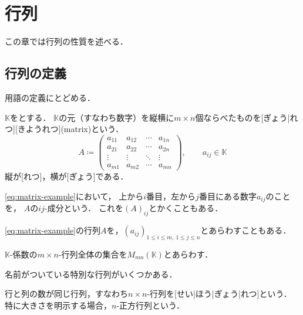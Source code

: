 \documentclass[../sotsu.tex]{subfiles}
\begin{document}
\section{行列}
\label{sec:matrix}

この章では行列の性質を述べる．

\subsection{行列の定義}

用語の定義にとどめる．

\begin{definition}[行列]
    $𝕂$をとする．
    $𝕂$の元（すなわち数字）を縦横に$m \times n$個ならべたものを[ぎょう|れつ][きようれつ](matrix)という．
    \begin{equation}
        \label{eq:matrix-example}
        A \coloneq 
        \begin{pmatrix}
            a_{11}  &  a_{12}  &  \cdots  &  a_{1n}  \\
            a_{21}  &  a_{22}  &  \cdots  &  a_{2n}  \\
            \vdots  &  \vdots  &  \ddots  &  \vdots  \\
            a_{m1}  &  a_{m2}  &  \cdots  &  a_{mn}
        \end{pmatrix}
        , \qquad 
        a_{ij} \in 𝕂
    \end{equation}
    縦が[れつ]，横が[ぎょう]である．

    \cref{eq:matrix-example}において，
    上から$i$番目，左から$j$番目にある数字$a_{ij}$のことを，
    $A$の$ij$-成分という．
    これを$(A)_{ij}$とかくこともある．
\end{definition}

\cref{eq:matrix-example}の行列$A$を，$(a_{ij})_{1 \leq i \leq m, \  1 \leq j \leq n}$とあらわすこともある．

\begin{definition}
    \label{dfn:set-of-matrix}
    $𝕂$-係数の$m \times n$-行列全体の集合を$M_{mn}(𝕂)$とあらわす．
\end{definition}

名前がついている特別な行列がいくつかある．

\begin{definition}[正方行列]
    行と列の数が同じ行列，すなわち$n \times n$-行列を[せい|ほう|ぎょう|れつ]という．
    特に大きさを明示する場合，$n$-正方行列という．
\end{definition}
\end{document}
